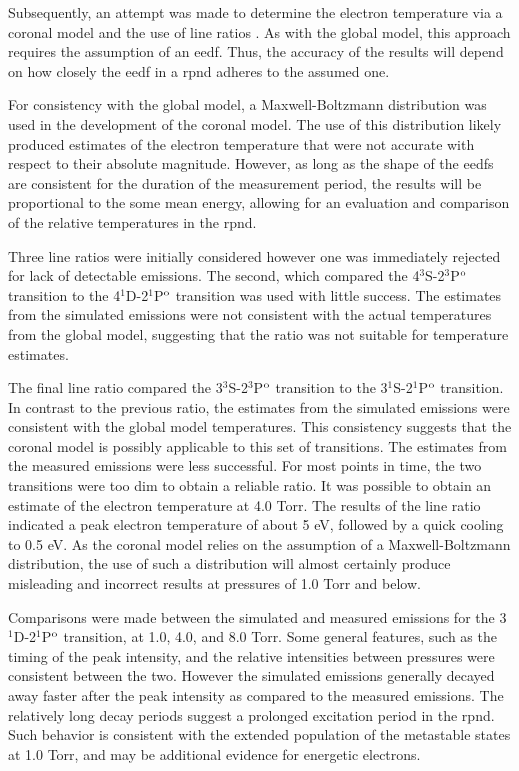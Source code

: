 Subsequently, an attempt was made to determine the electron temperature via a
coronal model and the use of line ratios \cite{Griem2005}. As with the global
model, this approach requires the assumption of an \acs{eedf}. Thus, the
accuracy of the results will depend on how closely the \acs{eedf} in a
\acs{rpnd} adheres to the assumed one.

For consistency with the global model, a Maxwell-Boltzmann distribution was used
in the development of the coronal model. The use of this distribution likely
produced estimates of the electron temperature that were not accurate with
respect to their absolute magnitude. However, as long as the shape of the
\acs{eedf}s are consistent for the duration of the measurement period, the
results will be proportional to the some mean energy, allowing for an evaluation
and comparison of the relative temperatures in the \acs{rpnd}.

Three line ratios were initially considered however one was immediately rejected
for lack of detectable emissions. The second, which compared the
4$^3$S-2$^3$P$^\mathrm{o}$ transition to the 4$^1$D-2$^1$P$^\mathrm{o}$ transition was used
with little success. The estimates from the simulated emissions were not
consistent with the actual temperatures from the global model, suggesting that
the ratio was not suitable for temperature estimates.

The final line ratio compared the 3$^3$S-2$^3$P$^\mathrm{o}$ transition to the
3$^1$S-2$^1$P$^\mathrm{o}$ transition. In contrast to the previous ratio, the estimates
from the simulated emissions were consistent with the global model temperatures.
This consistency suggests that the coronal model is possibly applicable to this
set of transitions. The estimates from the measured emissions were less
successful. For most points in time, the two transitions were too dim to obtain
a reliable ratio. It was possible to obtain an estimate of the electron
temperature at 4.0 Torr. The results of the line ratio indicated a peak electron
temperature of about 5 eV, followed by a quick cooling to 0.5 eV. As the coronal
model relies on the assumption of a Maxwell-Boltzmann distribution, the use of
such a distribution will almost certainly produce misleading and incorrect
results at pressures of 1.0 Torr and below.

Comparisons were made between the simulated and measured emissions for the
3$^1$D-2$^1$P$^\mathrm{o}$ transition, at 1.0, 4.0, and 8.0 Torr. Some general
features, such as the timing of the peak intensity, and the relative intensities
between pressures were consistent between the two. However the simulated
emissions generally decayed away faster after the peak intensity as compared to
the measured emissions. The relatively long decay periods suggest a prolonged
excitation period in the \acs{rpnd}. Such behavior is consistent with the
extended population of the metastable states at 1.0 Torr, and may be additional
evidence for energetic electrons.

